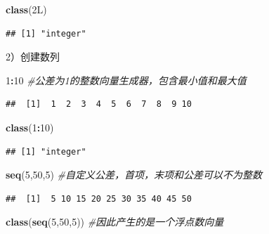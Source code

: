 \documentclass[]{book}
\newenvironment{Shaded}{\begin{snugshade}}{\end{snugshade}}
\newcommand{\CommentTok}[1]{\textcolor[rgb]{0.56,0.35,0.01}{\textit{#1}}}
\newcommand{\DecValTok}[1]{\textcolor[rgb]{0.00,0.00,0.81}{#1}}
\newcommand{\KeywordTok}[1]{\textcolor[rgb]{0.13,0.29,0.53}{\textbf{#1}}}
\newcommand{\NormalTok}[1]{#1}
\newcommand{\OperatorTok}[1]{\textcolor[rgb]{0.81,0.36,0.00}{\textbf{#1}}}
\begin{document}
\begin{Shaded}
\begin{Highlighting}[]
\KeywordTok{class}\NormalTok{(2L)}
\end{Highlighting}
\end{Shaded}

\begin{verbatim}
## [1] "integer"
\end{verbatim}

2）创建数列

\begin{Shaded}
\begin{Highlighting}[]
\DecValTok{1}\OperatorTok{:}\DecValTok{10} \CommentTok{#公差为1的整数向量生成器，包含最小值和最大值}
\end{Highlighting}
\end{Shaded}

\begin{verbatim}
##  [1]  1  2  3  4  5  6  7  8  9 10
\end{verbatim}

\begin{Shaded}
\begin{Highlighting}[]
\KeywordTok{class}\NormalTok{(}\DecValTok{1}\OperatorTok{:}\DecValTok{10}\NormalTok{)}
\end{Highlighting}
\end{Shaded}

\begin{verbatim}
## [1] "integer"
\end{verbatim}

\begin{Shaded}
\begin{Highlighting}[]
\KeywordTok{seq}\NormalTok{(}\DecValTok{5}\NormalTok{,}\DecValTok{50}\NormalTok{,}\DecValTok{5}\NormalTok{) }\CommentTok{#自定义公差，首项，末项和公差可以不为整数}
\end{Highlighting}
\end{Shaded}

\begin{verbatim}
##  [1]  5 10 15 20 25 30 35 40 45 50
\end{verbatim}

\begin{Shaded}
\begin{Highlighting}[]
\KeywordTok{class}\NormalTok{(}\KeywordTok{seq}\NormalTok{(}\DecValTok{5}\NormalTok{,}\DecValTok{50}\NormalTok{,}\DecValTok{5}\NormalTok{)) }\CommentTok{#因此产生的是一个浮点数向量}
\end{Highlighting}
\end{Shaded}
\end{document}
